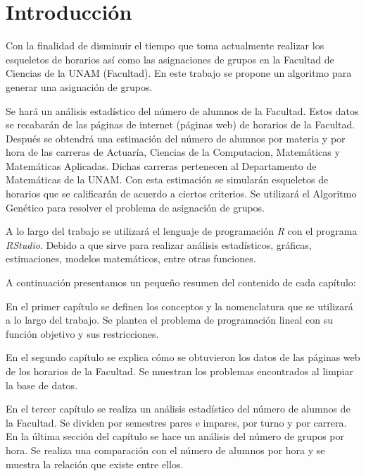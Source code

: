 \chapter*{Introducción}


Con la finalidad de disminuir el tiempo que toma actualmente realizar los esqueletos de horarios así como las asignaciones de grupos en la Facultad de Ciencias de la UNAM (Facultad). En este trabajo se propone un algoritmo para generar una asignación de grupos.

Se hará un análisis estadístico del número de alumnos de la Facultad. Estos datos se recabarán de las páginas de internet (páginas web) de horarios de la Facultad. Después se obtendrá una estimación del número de alumnos por materia y por hora de las carreras de Actuaría, Ciencias de la Computacion, Matemáticas y Matemáticas Aplicadas. Dichas carreras pertenecen al Departamento de Matemáticas de la UNAM. Con esta estimación se simularán esqueletos de horarios que se calificarán de acuerdo a ciertos criterios. Se utilizará el Algoritmo Genético para resolver el problema de asignación de grupos. 

A lo largo del trabajo se utilizará el lenguaje de programación \textit{R} con el programa \textit{RStudio}. Debido a que sirve para realizar análisis estadísticos, gráficas, estimaciones, modelos matemáticos, entre otras funciones.

A continuación presentamos un pequeño resumen del contenido de cada capítulo:

En el primer capítulo se definen los conceptos y la nomenclatura que se utilizará a lo largo del trabajo. Se plantea el problema de programación lineal con su función objetivo y sus restricciones.

En el segundo capítulo se explica cómo se obtuvieron los datos de las páginas web de los horarios de la Facultad. Se muestran los problemas encontrados al limpiar la base de datos.

En el tercer capítulo se realiza un análisis estadístico del número de alumnos de la Facultad. Se dividen por semestres pares e impares, por turno y por carrera. En la última sección del capítulo se hace un análisis del número de grupos por hora. Se realiza una comparación con el número de alumnos por hora y se muestra la relación que existe entre ellos.

